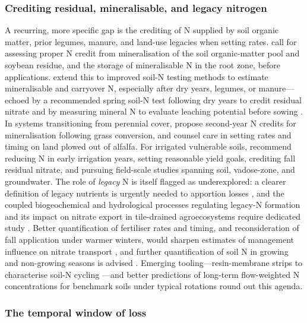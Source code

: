 \subsubsection{Crediting residual, mineralisable, and legacy nitrogen}

A recurring, more specific gap is the crediting of N supplied by soil organic matter, prior legumes, manure, and land-use legacies when setting rates. \textcite{Bakhsh2007,Bakhsh2005} call for assessing proper N credit from mineralisation of the soil organic-matter pool and soybean residue, and the storage of mineralisable N in the root zone, before applications. \textcite{Randall2001} extend this to improved soil-N testing methods to estimate mineralisable and carryover N, especially after dry years, legumes, or manure---echoed by a recommended spring soil-N test following dry years to credit residual nitrate \parencite{RANDALL1995} and by measuring mineral N to evaluate leaching potential before sowing \parencite{Conrad2009}. In systems transitioning from perennial cover, \textcite{Huggins2001} propose second-year N credits for mineralisation following grass conversion, and \textcite{ROBBINS1980} counsel care in setting rates and timing on land plowed out of alfalfa. For irrigated vulnerable soils, \textcite{Derby2009} recommend reducing N in early irrigation years, setting reasonable yield goals, crediting fall residual nitrate, and pursuing field-scale studies spanning soil, vadose-zone, and groundwater. The role of \emph{legacy} N is itself flagged as underexplored: a clearer definition of legacy nutrients is urgently needed to apportion losses \parencite{Williams2022}, and the coupled biogeochemical and hydrological processes regulating legacy-N formation and its impact on nitrate export in tile-drained agroecosystems require dedicated study \parencite{Hu2024}. Better quantification of fertiliser rates and timing, and reconsideration of fall application under warmer winters, would sharpen estimates of management influence on nitrate transport \parencite{Gentry2014}, and further quantification of soil N in growing and non-growing seasons is advised \parencite{Bosompemaa2021}. Emerging tooling---resin-membrane strips to characterise soil-N cycling \parencite{Masri2024}---and better predictions of long-term flow-weighted N concentrations for benchmark soils under typical rotations \parencite{Skaggs2012} round out this agenda.

\subsubsection{The temporal window of loss}

